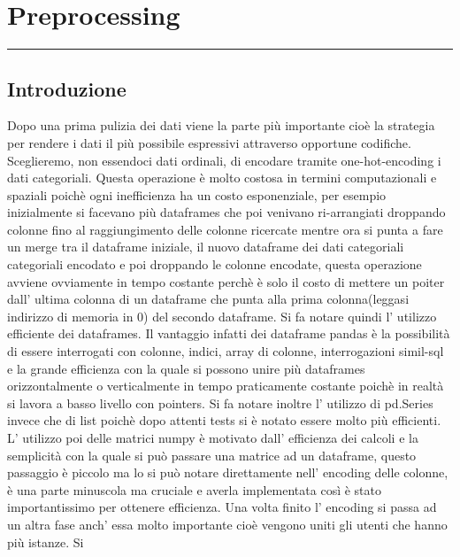 \documentclass[11pt]{article}
\begin{document}
    \section{Preprocessing}\label{preprocessing}

\begin{center}\rule{0.5\linewidth}{\linethickness}\end{center}

\subsection{Introduzione}\label{introduzione}

Dopo una prima pulizia dei dati viene la parte più importante cioè la
strategia per rendere i dati il più possibile espressivi attraverso
opportune codifiche. Sceglieremo, non essendoci dati ordinali, di
encodare tramite one-hot-encoding i dati categoriali. Questa operazione
è molto costosa in termini computazionali e spaziali poichè ogni
inefficienza ha un costo esponenziale, per esempio inizialmente si
facevano più dataframes che poi venivano ri-arrangiati droppando colonne
fino al raggiungimento delle colonne ricercate mentre ora si punta a
fare un merge tra il dataframe iniziale, il nuovo dataframe dei dati
categoriali categoriali encodato e poi droppando le colonne encodate,
questa operazione avviene ovviamente in tempo costante perchè è solo il
costo di mettere un poiter dall' ultima colonna di un dataframe che
punta alla prima colonna(leggasi indirizzo di memoria in 0) del secondo
dataframe. Si fa notare quindi l' utilizzo efficiente dei dataframes. Il
vantaggio infatti dei dataframe pandas è la possibilità di essere
interrogati con colonne, indici, array di colonne, interrogazioni
simil-sql e la grande efficienza con la quale si possono unire più
dataframes orizzontalmente o verticalmente in tempo praticamente
costante poichè in realtà si lavora a basso livello con pointers. Si fa
notare inoltre l' utilizzo di pd.Series invece che di list poichè dopo
attenti tests si è notato essere molto più efficienti. L' utilizzo poi
delle matrici numpy è motivato dall' efficienza dei calcoli e la
semplicità con la quale si può passare una matrice ad un dataframe,
questo passaggio è piccolo ma lo si può notare direttamente nell'
encoding delle colonne, è una parte minuscola ma cruciale e averla
implementata così è stato importantissimo per ottenere efficienza. Una
volta finito l' encoding si passa ad un altra fase anch' essa molto
importante cioè vengono uniti gli utenti che hanno più istanze. Si
\end{document}
